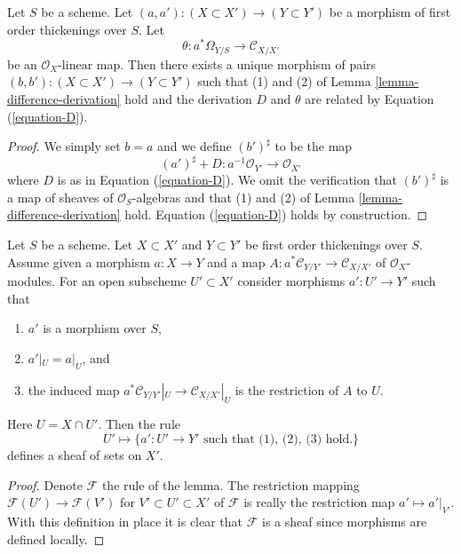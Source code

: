 \begin{lemma}
\label{lemma-action-by-derivations}
Let $S$ be a scheme.
Let $(a, a') : (X \subset X') \to (Y \subset Y')$
be a morphism of first order thickenings over $S$.
Let
$$
\theta : a^*\Omega_{Y/S} \to \mathcal{C}_{X/X'}
$$
be an $\mathcal{O}_X$-linear map. Then there exists a unique morphism of pairs
$(b, b') : (X \subset X') \to (Y \subset Y')$ such that
(1) and (2) of
Lemma \ref{lemma-difference-derivation}
hold and the derivation $D$ and $\theta$ are related by
Equation (\ref{equation-D}).
\end{lemma}

\begin{proof}
We simply set $b = a$ and we define $(b')^\sharp$ to be the map
$$
(a')^\sharp + D : a^{-1}\mathcal{O}_{Y'} \to \mathcal{O}_{X'}
$$
where $D$ is as in Equation (\ref{equation-D}). We omit the verification
that $(b')^\sharp$ is a map of sheaves of $\mathcal{O}_S$-algebras and
that (1) and (2) of
Lemma \ref{lemma-difference-derivation}
hold. Equation (\ref{equation-D}) holds by construction.
\end{proof}

\begin{lemma}
\label{lemma-sheaf}
Let $S$ be a scheme.
Let $X \subset X'$ and $Y \subset Y'$ be first order thickenings
over $S$. Assume given a morphism $a : X \to Y$ and a map
$A : a^*\mathcal{C}_{Y/Y'} \to \mathcal{C}_{X/X'}$ of
$\mathcal{O}_X$-modules. For an open subscheme $U' \subset X'$
consider morphisms $a' : U' \to Y'$ such that
\begin{enumerate}
\item $a'$ is a morphism over $S$,
\item $a'|_U = a|_U$, and
\item the induced map
$a^*\mathcal{C}_{Y/Y'}|_U \to \mathcal{C}_{X/X'}|_U$
is the restriction of $A$ to $U$.
\end{enumerate}
Here $U = X \cap U'$. Then the rule
\begin{equation}
\label{equation-sheaf}
U' \mapsto
\{a' : U' \to Y'\text{ such that (1), (2), (3) hold.}\}
\end{equation}
defines a sheaf of sets on $X'$.
\end{lemma}

\begin{proof}
Denote $\mathcal{F}$ the rule of the lemma.
The restriction mapping $\mathcal{F}(U') \to \mathcal{F}(V')$ for
$V' \subset U' \subset X'$
of $\mathcal{F}$ is really the restriction map $a' \mapsto a'|_{V'}$.
With this definition in place it is clear that $\mathcal{F}$ is a
sheaf since morphisms are defined locally.
\end{proof}

